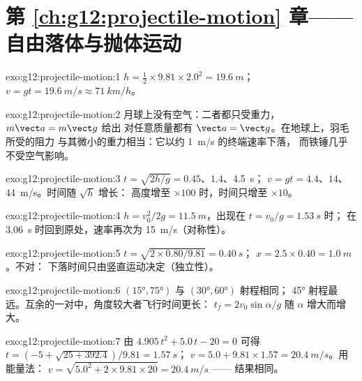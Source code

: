 \section*{第 \ref{ch:g12:projectile-motion} 章——自由落体与抛体运动}

\begin{solution}{exo:g12:projectile-motion:1}
$h = \tfrac12 \times 9.81 \times 2.0^2 = \qty{19.6}{m}$；
$v = gt = \qty{19.6}{m/s} \approx \qty{71}{km/h}$。
\end{solution}

\begin{solution}{exo:g12:projectile-motion:2}
月球上没有空气：二者都只受重力，$m\vect a = m\vect g$ 给出
对任意质量都有 $\vect a = \vect g$。在地球上，羽毛所受的阻力
与其微小的重力相当：它以约 \qty{1}{m/s} 的终端速率下落，
而铁锤几乎不受空气影响。
\end{solution}

\begin{solution}{exo:g12:projectile-motion:3}
$t = \sqrt{2h/g} = 0.45$、$1.4$、\qty{4.5}{s}；
$v = gt = 4.4$、$14$、\qty{44}{m/s}。时间随 $\sqrt h$ 增长：
高度增至 $\times 100$ 时，时间只增至 $\times 10$。
\end{solution}

\begin{solution}{exo:g12:projectile-motion:4}
$h = v_0^2/2g = \qty{11.5}{m}$，出现在 $t = v_0/g = \qty{1.53}{s}$ 时；
在 \qty{3.06}{s} 时回到原处，速率再次为 \qty{15}{m/s}（对称性）。
\end{solution}

\begin{solution}{exo:g12:projectile-motion:5}
$t = \sqrt{2 \times 0.80/9.81} = \qty{0.40}{s}$；
$x = 2.5 \times 0.40 = \qty{1.0}{m}$。不对：
下落时间只由竖直运动决定（独立性）。
\end{solution}

\begin{solution}{exo:g12:projectile-motion:6}
$(\ang{15},\ang{75})$ 与 $(\ang{30},\ang{60})$ 射程相同；
\ang{45} 射程最远。互余的一对中，角度较大者飞行时间更长：
$t_f = 2v_0\sin\alpha/g$ 随 $\alpha$ 增大而增大。
\end{solution}

\begin{solution}{exo:g12:projectile-motion:7}
由 $4.905\,t^2 + 5.0\,t - 20 = 0$ 可得
$t = (-5 + \sqrt{25 + 392.4})/9.81 = \qty{1.57}{s}$；
$v = 5.0 + 9.81 \times 1.57 = \qty{20.4}{m/s}$。用能量法：
$v = \sqrt{5.0^2 + 2 \times 9.81 \times 20} = \qty{20.4}{m/s}$ ——
结果相同。
\end{solution}

